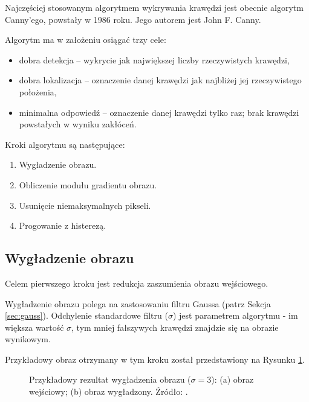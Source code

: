 \documentclass[a4paper,twocolumn,12pt]{article}
\begin{document}
Najczęściej stosowanym algorytmem wykrywania krawędzi jest obecnie algorytm Canny'ego, powstały w 1986 roku.
Jego autorem jest John F. Canny.

Algorytm ma w założeniu osiągać trzy cele:
\begin{itemize}
 \item dobra detekcja – wykrycie jak największej liczby rzeczywistych krawędzi,
 \item dobra lokalizacja – oznaczenie danej krawędzi jak najbliżej jej rzeczywistego położenia,
 \item minimalna odpowiedź – oznaczenie danej krawędzi tylko raz; brak krawędzi powstałych w wyniku zakłóceń.
\end{itemize}

Kroki algorytmu są następujące:
\begin{enumerate}
 \item Wygładzenie obrazu.
 \item Obliczenie modułu gradientu obrazu.
 \item Usunięcie niemaksymalnych pikseli.
 \item Progowanie z histerezą.
\end{enumerate}


\subsection{Wygładzenie obrazu}

Celem pierwszego kroku jest redukcja zaszumienia obrazu wejściowego.

Wygładzenie obrazu polega na zastosowaniu filtru Gaussa (patrz Sekcja \ref{sec:gauss}).
Odchylenie standardowe filtru ($\sigma$) jest parametrem algorytmu - im większa wartość $\sigma$, tym mniej fałszywych krawędzi znajdzie się na obrazie wynikowym.

Przykładowy obraz otrzymany w tym kroku został przedstawiony na Rysunku \ref{fig:canny_smoothing}.

\begin{figure}[!ht]
 \begin{center}
 \end{center}
 \caption{
  Przykładowy rezultat wygładzenia obrazu ($\sigma = 3$):
  (a) obraz wejściowy;
  (b) obraz wygładzony.
  Źródło: \cite{boldak}.
 }
 \label{fig:canny_smoothing}
\end{figure}
\end{document}
